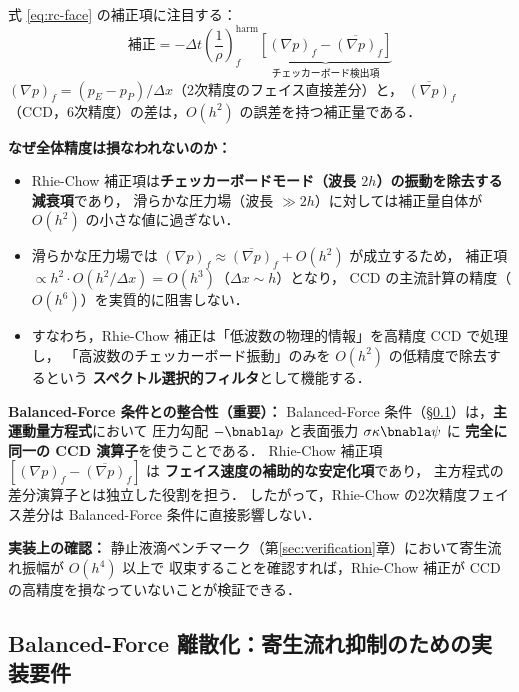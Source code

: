 \begin{tcolorbox}[warnbox, title={Rhie-Chow 補正項の精度次数と高次 CCD との整合性}]
式 \eqref{eq:rc-face} の補正項に注目する：
\[
  \text{補正} = -\Delta t\!\left(\frac{1}{\rho}\right)^{\mathrm{harm}}_f
  \underbrace{\left[(\nabla p)_f - \overline{(\nabla p)}_f\right]}_{\text{チェッカーボード検出項}}
\]
$(\nabla p)_f = (p_E - p_P)/\Delta x$（2次精度のフェイス直接差分）と，
$\overline{(\nabla p)}_f$（CCD，6次精度）の差は，$O(h^2)$ の誤差を持つ補正量である．

\textbf{なぜ全体精度は損なわれないのか：}
\begin{itemize}
  \item Rhie-Chow 補正項は\textbf{チェッカーボードモード（波長 $2h$）の振動を除去する減衰項}であり，
        滑らかな圧力場（波長 $\gg 2h$）に対しては補正量自体が $O(h^2)$ の小さな値に過ぎない．
  \item 滑らかな圧力場では $(\nabla p)_f \approx \overline{(\nabla p)}_f + O(h^2)$ が成立するため，
        補正項 $\propto h^2 \cdot O(h^2/\Delta x) = O(h^3)$（$\Delta x \sim h$）となり，
        CCD の主流計算の精度（$O(h^6)$）を実質的に阻害しない．
  \item すなわち，Rhie-Chow 補正は「低波数の物理的情報」を高精度 CCD で処理し，
        「高波数のチェッカーボード振動」のみを $O(h^2)$ の低精度で除去するという
        \textbf{スペクトル選択的フィルタ}として機能する．
\end{itemize}

\textbf{Balanced-Force 条件との整合性（重要）：}
Balanced-Force 条件（§\ref{sec:balanced_force}）は，\textbf{主運動量方程式}において
圧力勾配 $-\bnabla p$ と表面張力 $\sigma\kappa\bnabla\psi$ に
\textbf{完全に同一の CCD 演算子}を使うことである．
Rhie-Chow 補正項 $[(\nabla p)_f - \overline{(\nabla p)}_f]$ は
\textbf{フェイス速度の補助的な安定化項}であり，
主方程式の差分演算子とは独立した役割を担う．
したがって，Rhie-Chow の2次精度フェイス差分は Balanced-Force 条件に直接影響しない．

\textbf{実装上の確認：} 静止液滴ベンチマーク（第\ref{sec:verification}章）において寄生流れ振幅が $O(h^4)$ 以上で
収束することを確認すれば，Rhie-Chow 補正が CCD の高精度を損なっていないことが検証できる．
\end{tcolorbox}

\subsection{Balanced-Force 離散化：寄生流れ抑制のための実装要件}
\label{sec:balanced_force}

